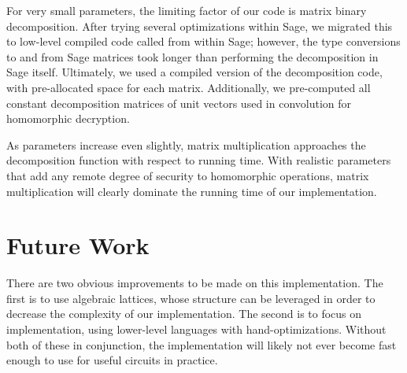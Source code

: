 \documentclass{article}
\begin{document}
For very small parameters, the limiting factor of our code is matrix binary
decomposition. After trying several optimizations within Sage, we migrated
this to low-level compiled code called from within Sage; however, the type 
conversions to and from Sage matrices took longer than performing the 
decomposition in Sage itself. Ultimately, we used a compiled version of the 
decomposition code, with pre-allocated space for each matrix. Additionally,
we pre-computed all constant decomposition matrices of unit vectors used in
convolution for homomorphic decryption.

As parameters increase even slightly, matrix multiplication approaches the 
decomposition function with respect to running time. With realistic parameters
that add any remote degree of security to homomorphic operations, matrix 
multiplication will clearly dominate the running time of our implementation.

\section{Future Work}

There are two obvious improvements to be made on this implementation. The first
is to use algebraic lattices, whose structure can be leveraged in order to
decrease the complexity of our implementation. The second is to focus on
implementation, using lower-level languages with hand-optimizations. Without
both of these in conjunction, the implementation will likely not ever become
fast enough to use for useful circuits in practice. 
\end{document}
